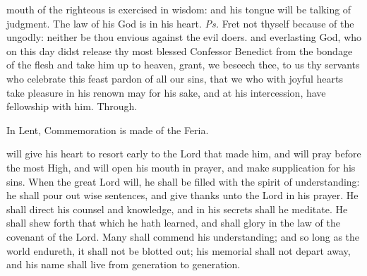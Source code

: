 
\introit
 mouth of the righteous is exercised in wisdom: and his tongue will be talking of judgment. The law of his God is in his heart. \textit{Ps.} Fret not thyself because of the ungodly: neither be thou envious against the evil doers.
\collect
{} and everlasting God, who on this day didst release thy most blessed Confessor Benedict from the bondage of the flesh and take him up to heaven, grant, we beseech thee, to us thy servants who celebrate this feast pardon of all our sins, that we who with joyful hearts take pleasure in his renown may for his sake, and at his intercession, have fellowship with him. Through.
\begin{rubric}
    In Lent, Commemoration is made of the Feria.
\end{rubric}
 will give his heart to resort early to the Lord that made him, and will pray before the most High, and will open his mouth in prayer, and make supplication for his sins. When the great Lord will, he shall be filled with the spirit of understanding: he shall pour out wise sentences, and give thanks unto the Lord in his prayer. He shall direct his counsel and knowledge, and in his secrets shall he meditate. He shall shew forth that which he hath learned, and shall glory in the law of the covenant of the Lord. Many shall commend his understanding; and so long as the world endureth, it shall not be blotted out; his memorial shall not depart away, and his name shall live from generation to generation.

